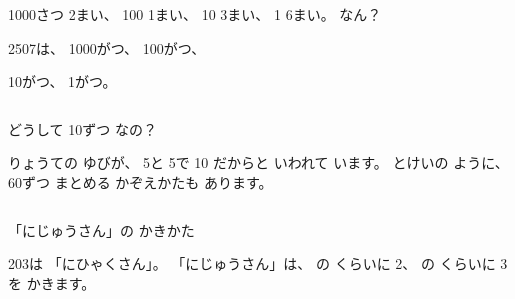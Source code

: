 \begin{jibun}
1000さつ 2まい、 100 1まい、 10 3まい、 1 6まい。 なん？\par\vspace{3pt}
\begin{bkfigure}
\end{bkfigure}
\bkkotaeran[6\zw]
\end{jibun}

\begin{jibun}
2507は、 1000が\enspace\bkkakikomi\enspace つ、 100が\enspace\bkkakikomi\enspace つ、\par
\noindent 10が\enspace\bkkakikomi\enspace つ、 1が\enspace\bkkakikomi\enspace つ。
\end{jibun}

\begin{column}{どうして 10ずつ なの？}
\noindent\begin{minipage}[c]{0.68\linewidth}
りょうての ゆびが、 5と 5で 10 だからと いわれて います。 とけいの ように、 60ずつ まとめる かぞえかたも あります。
\end{minipage}\hfill
\begin{minipage}[c]{0.3\linewidth}\centering
{}
\end{minipage}
\end{column}





\clearpage

\begin{tsumazuki}{「にじゅうさん」の かきかた}
\bkbatsu{}\hspace{3\zw}\bkmaru{}\par
203は 「にひゃくさん」。 「にじゅうさん」は、 の くらいに 2、 の くらいに 3を かきます。
\end{tsumazuki}

